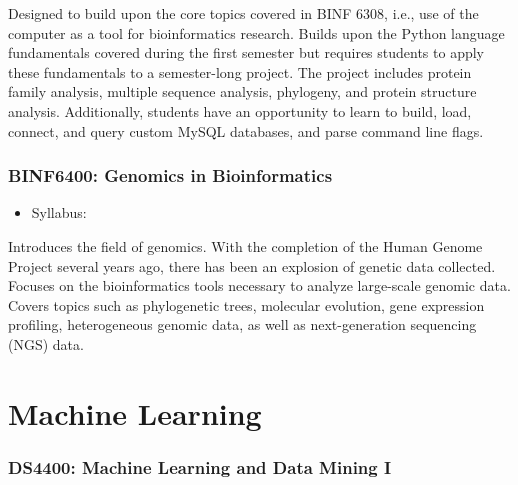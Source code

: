 \documentclass[
  letterpaper,
  DIV=11,
  numbers=noendperiod]{scrreprt}
\providecommand{\tightlist}{%
  \setlength{\itemsep}{0pt}\setlength{\parskip}{0pt}}\usepackage{longtable,booktabs,array}
\begin{document}
Designed to build upon the core topics covered in BINF 6308, i.e., use
of the computer as a tool for bioinformatics research. Builds upon the
Python language fundamentals covered during the first semester but
requires students to apply these fundamentals to a semester-long
project. The project includes protein family analysis, multiple sequence
analysis, phylogeny, and protein structure analysis. Additionally,
students have an opportunity to learn to build, load, connect, and query
custom MySQL databases, and parse command line flags.

\hypertarget{binf6400-genomics-in-bioinformatics}{%
\subsubsection*{\texorpdfstring{\textbf{BINF6400: Genomics in
Bioinformatics}}{BINF6400: Genomics in Bioinformatics}}\label{binf6400-genomics-in-bioinformatics}}

\begin{itemize}
\tightlist
\item
  Syllabus:
\end{itemize}

Introduces the field of genomics. With the completion of the Human
Genome Project several years ago, there has been an explosion of genetic
data collected. Focuses on the bioinformatics tools necessary to analyze
large-scale genomic data. Covers topics such as phylogenetic trees,
molecular evolution, gene expression profiling, heterogeneous genomic
data, as well as next-generation sequencing (NGS) data.

\hypertarget{machine-learning}{%
\section*{\texorpdfstring{\textbf{Machine
Learning}}{Machine Learning}}\label{machine-learning}}


\hypertarget{ds4400-machine-learning-and-data-mining-i}{%
\subsubsection*{\texorpdfstring{\textbf{DS4400: Machine Learning and
Data Mining
I}}{DS4400: Machine Learning and Data Mining I}}\label{ds4400-machine-learning-and-data-mining-i}}
\end{document}
